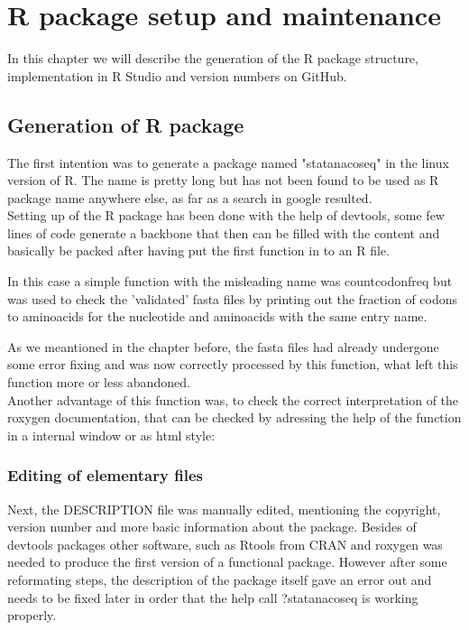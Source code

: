 \chapter{R package setup and maintenance}
In this chapter we will describe the generation of the R package structure, implementation in R Studio and version numbers on GitHub.


\section{Generation of R package}
The first intention was to generate a package named "statanacoseq" in the linux version of R. The name is pretty long but has not been found to be used as R package name anywhere else, as far as a search in google resulted. \\
Setting up of the R package has been done with the help of devtools, some few lines of code generate a backbone that then can be filled with the content and basically be packed after having put the first function in to an R file. 

  

In this case a simple function with the misleading name was countcodonfreq but was used to check the 'validated' fasta files by printing out the fraction of codons to aminoacids for the nucleotide and aminoacids with the same entry name. 
  
As we meantioned in the chapter before, the fasta files had already undergone some error fixing and was now correctly processed by this function, what left this function more or less abandoned. \\
Another advantage of this function was, to check the correct interpretation of the roxygen documentation, that can be checked by adressing the help of the function in a internal window or as html style:
  

\subsection{Editing of elementary files}
Next, the DESCRIPTION file was manually edited, mentioning the copyright, version number and more basic information about the package. Besides of devtools packages other software, such as Rtools from CRAN and roxygen was needed to produce the first version of a functional package. However after some reformating steps, the description of the package itself gave an error out and needs to be fixed later in order that the help call ?statanacoseq is working properly. \\

